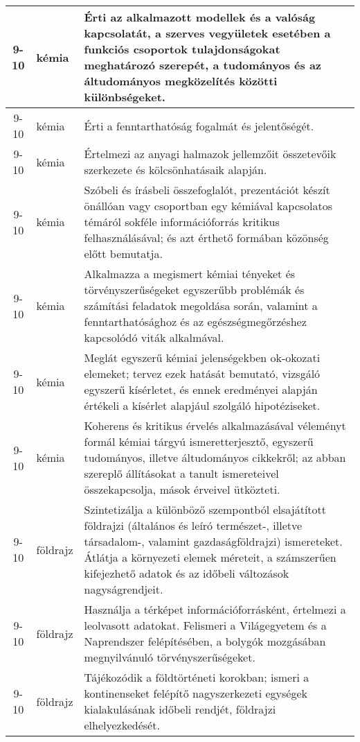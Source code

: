 \begin{small}
\begin{longtable}{c | p{2cm} |  p{11cm} }
              9-10 & kémia & Érti az alkalmazott modellek és a valóság kapcsolatát, a szerves vegyületek esetében a funkciós csoportok tulajdonságokat meghatározó szerepét, a tudományos és az áltudományos megközelítés közötti különbségeket. \\ \hline
              9-10 & kémia & Érti a fenntarthatóság fogalmát és jelentőségét. \\ \hline
              9-10 & kémia & Értelmezi az anyagi halmazok jellemzőit összetevőik szerkezete és kölcsönhatásaik alapján. \\ \hline
              9-10 & kémia & Szóbeli és írásbeli összefoglalót, prezentációt készít önállóan vagy csoportban egy kémiával kapcsolatos témáról sokféle információforrás kritikus felhasználásával; és azt érthető formában közönség előtt bemutatja. \\ \hline
              9-10 & kémia & Alkalmazza a megismert kémiai tényeket és törvényszerűségeket egyszerűbb problémák és számítási feladatok megoldása során, valamint a fenntarthatósághoz és az egészségmegőrzéshez kapcsolódó viták alkalmával. \\ \hline
              9-10 & kémia & Meglát egyszerű kémiai jelenségekben ok-okozati elemeket; tervez ezek hatását bemutató, vizsgáló egyszerű kísérletet, és ennek eredményei alapján értékeli a kísérlet alapjául szolgáló hipotéziseket. \\ \hline
              9-10 & kémia & Koherens és kritikus érvelés alkalmazásával véleményt formál kémiai tárgyú ismeretterjesztő, egyszerű tudományos, illetve áltudományos cikkekről; az abban szereplő állításokat a tanult ismereteivel összekapcsolja, mások érveivel ütközteti. \\ \hline
              9-10 & földrajz & Szintetizálja a különböző szempontból elsajátított földrajzi (általános és leíró természet-, illetve társadalom-, valamint gazdaságföldrajzi) ismereteket. Átlátja a környezeti elemek méreteit, a számszerűen kifejezhető adatok és az időbeli változások nagyságrendjeit. \\ \hline
              9-10 & földrajz & Használja a térképet információforrásként, értelmezi a leolvasott adatokat. Felismeri a Világegyetem és a Naprendszer felépítésében, a bolygók mozgásában megnyilvánuló törvényszerűségeket. \\ \hline
              9-10 & földrajz & Tájékozódik a földtörténeti korokban; ismeri a kontinenseket felépítő nagyszerkezeti egységek kialakulásának időbeli rendjét, földrajzi elhelyezkedését. \\ \hline

\end{longtable}
\end{small}

